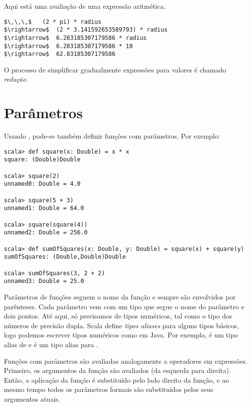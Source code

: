 \example
Aqui est\'{a} uma avalia\c{c}\~{a}o de uma express\~{a}o aritm\'{e}tica.

\begin{lstlisting}
$\,\,\,$   (2 * pi) * radius
$\rightarrow$  (2 * 3.141592653589793) * radius
$\rightarrow$  6.283185307179586 * radius
$\rightarrow$  6.283185307179586 * 10
$\rightarrow$  62.83185307179586
\end{lstlisting}
O processo de simplificar gradualmente express\~{o}es para valores \'{e} 
chamado {\em redu\c{c}\~{a}o}.

\section{Par\^{a}metros}

Usando , pode-se tamb\'{e}m definir fun\c{c}\~{o}es com par\^{a}metros. Por exemplo:
\begin{lstlisting}
scala> def square(x: Double) = x * x
square: (Double)Double

scala> square(2)
unnamed0: Double = 4.0

scala> square(5 + 3)
unnamed1: Double = 64.0

scala> square(square(4))
unnamed2: Double = 256.0

scala> def sumOfSquares(x: Double, y: Double) = square(x) + square(y)
sumOfSquares: (Double,Double)Double

scala> sumOfSquares(3, 2 + 2)
unnamed3: Double = 25.0
\end{lstlisting}

Par\^{a}metros de fun\c{c}\~{o}es seguem o nome da fun\c{c}\~{a}o e sempre s\~{a}o envolvidos por
par\^{e}nteses. Cada par\^{a}metro vem com um tipo que segue o nome do par\^{a}metro
e dois pontos. At\'{e} aqui, s\'{o} precisamos de tipos num\'{e}ricos, tal como o tipo
 dos n\'{u}meros de precis\~{a}o dupla. Scala define {\em tipos
aliases} para alguns tipos b\'{a}sicos, logo podemos escrever tipos num\'{e}ricos 
como em Java. Por exemplo,  \'{e} um tipo alias de 
e  \'{e} um tipo alias para .       

Fun\c{c}\~{o}es com par\^{a}metros s\~{a}o avaliadas analogamente a operadores em express\~{o}es.
Primeiro, os argumentos da fun\c{c}\~{a}o s\~{a}o avaliados (da esquerda para direita). 
Ent\~{a}o, a aplica\c{c}\~{a}o da fun\c{c}\~{a}o \'{e} substitu\'{i}do pelo lado direito da fun\c{c}\~{a}o, e
ao mesmo tempo todos os par\^{a}metros formais s\~{a}o substitu\'{i}dos pelos seus 
argumentos atuais. 

